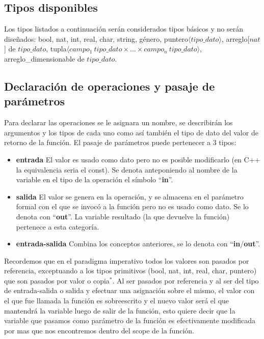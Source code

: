 \documentclass[10pt, a4paper]{report}
\begin{document}
\subsection{Tipos disponibles}

Los tipos listados a continuaci\'on ser\'an considerados tipos b\'asicos y no ser\'an dise\~nados: bool, nat, int, real, char, string, g\'enero, puntero$\langle tipo\_dato \rangle$, arreglo[$nat$] de $tipo\_dato$, tupla$\langle campo_1\:tipo\_dato \times ... \times campo_n\:tipo\_dato \rangle$, arreglo\_dimensionable de $tipo\_dato$.

\subsection{Declaraci\'on de operaciones y pasaje de par\'ametros}

Para declarar las operaciones se le asignara un nombre, se describir\'an los argumentos y los tipos de cada uno como as\'i tambi\'en el tipo de dato del valor de retorno de la funci\'on. El pasaje de par\'ametros puede pertenecer a 3 tipos:

\begin{itemize}
 \item \textbf{entrada} El valor es usado como dato pero no es posible modificarlo (en C++ la equivalencia seria el const). Se denota anteponiendo al nombre de la variable en el tipo de la operaci\'on el s\'imbolo ``\textbf{in}''.
 \item \textbf{salida} El valor se genera en la operaci\'on, y se almacena en el par\'ametro formal con el que se invoc\'o a la funci\'on pero no es usado como dato. Se lo denota con ``\textbf{out}''. La variable resultado (la que devuelve la funci\'on) pertenece a esta categor\'ia.
 \item \textbf{entrada-salida} Combina los conceptos anteriores, se lo denota con ``\textbf{in}/\textbf{out}''.
\end{itemize}

Recordemos que en el paradigma imperativo todos los valores son pasados por referencia, exceptuando a los tipos primitivos (bool, nat, int, real, char, puntero) que son pasados por valor o copia$^*$. Al ser pasados por referencia y al ser del tipo de entrada-salida o salida y efectuar una asignaci\'on sobre el mismo, el valor con el que fue llamada la funci\'on es sobreescrito y el nuevo valor ser\'a el que mantendr\'a la variable luego de salir de la funci\'on, esto quiere decir que la variable que pasamos como par\'ametro de la funci\'on es efectivamente modificada por mas que nos encontremos dentro del scope de la funci\'on.
\end{document}
